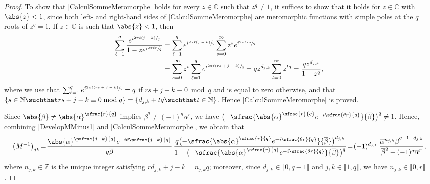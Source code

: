 \begin{proof}
To show that \eqref{CalculSommeMeromorphe} holds for every $z \in \mathbb C$ such that $z^q \neq 1$, it suffices to show that it holds for $z \in \mathbb C$ with $\abs{z} < 1$, since both left- and right-hand sides of \eqref{CalculSommeMeromorphe} are meromorphic functions with simple poles at the $q$ roots of $z^q = 1$. If $z \in \mathbb C$ is such that $\abs{z} < 1$, then\vspace*{-3pt}
\begin{align*}
\sum_{\ell=1}^q \frac{e^{i \sfrac{2\pi \ell (j - k)}{q}}}{1 - z e^{i \sfrac{2 \pi \ell r}{q}}} &= \sum_{\ell=1}^q e^{i \sfrac{2\pi \ell (j - k)}{q}} \sum_{s=0}^\infty z^s e^{i \sfrac{2 \pi \ell r s}{q}}\\
&= \sum_{s=0}^\infty z^s \sum_{\ell=1}^q e^{i \sfrac{2\pi \ell (r s + j - k)}{q}} = q z^{d_{j, k}} \sum_{t = 0}^\infty z^{t q} = \frac{q z^{d_{j, k}}}{1 - z^q},
\end{align*}
where we use that $\sum_{\ell=1}^q e^{i \sfrac{2\pi \ell (r s + j - k)}{q}} = q$ if $r s + j - k \equiv 0 \bmod q$ and is equal to zero otherwise, and that $\{s \in \mathbb N \suchthat r s + j - k \equiv 0 \bmod q\} = \{d_{j, k} + t q \suchthat t \in \mathbb N\}$. Hence \eqref{CalculSommeMeromorphe} is proved.

Since $\abs{\beta} \neq \abs{\alpha}^{\sfrac{r}{q}}$ implies $\overline\beta^q \neq (-1)^q \overline\alpha^r$, we have $\bigl(-\sfrac{\abs{\alpha}^{\sfrac{r}{q}} e^{-i\sfrac{\theta r}{q}}}{\overline\beta}\bigr)^q \neq 1$. Hence, combining \eqref{DevelopMMinus1} and \eqref{CalculSommeMeromorphe}, we obtain that\vspace*{-3pt}
\[
\left(M^{-1}\right)_{jk} \!=\! \frac{\abs{\alpha}^{\psfrac{j-k}{q}} e^{-i\theta\psfrac{j-k}{q}}}{q \overline\beta}\, \frac{q \bigl(-\sfrac{\abs{\alpha}^{\sfrac{r}{q}} e^{-i\sfrac{\theta r}{q}}}{\overline\beta}\bigr)^{d_{j, k}}}{1 - \bigl(-\sfrac{\abs{\alpha}^{\sfrac{r}{q}} e^{-i\sfrac{\theta r}{q}}}{\overline\beta}\bigr)^q} \!=\! (-1)^{d_{j, k}}\, \frac{\overline\alpha^{n_{j, k}}\overline\beta^{q-1-d_{j,k}}}{\overline\beta^q - (-1)^q \overline\alpha^r},
\]
where $n_{j, k} \in \mathbb Z$ is the unique integer satisfying $r d_{j, k} + j - k = n_{j, k} q$; moreover, since $d_{j, k} \in \llbracket 0, q-1\rrbracket$ and $j, k \in \llbracket 1, q\rrbracket$, we have $n_{j, k} \in \llbracket 0, r\rrbracket$.


\end{proof}
